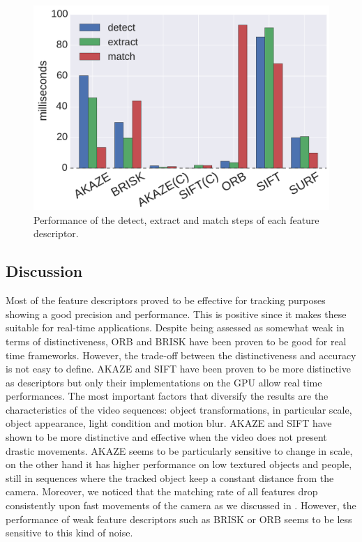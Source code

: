 \begin{figure}[!htb]
	\includegraphics[width=0.95\linewidth]{imgs/performances.pdf}
\vspace{-2.5mm}	
\caption{Performance of the detect, extract and match steps of each feature descriptor.}
\label{fig:speed_b}
\end{figure}


\subsection{Discussion}

Most of the feature descriptors proved to be effective for tracking purposes showing a good precision and performance. This is positive since it makes these suitable for real-time applications. Despite being assessed as somewhat weak in terms of distinctiveness, ORB and BRISK have been proven to be good for real time frameworks. 
However, the trade-off between the distinctiveness and accuracy is not easy to define.
AKAZE and SIFT have been proven to be more distinctive as descriptors but only their implementations on the GPU allow real time performances. 
The most important factors that diversify the results are the characteristics of the video sequences: object transformations, in particular scale, object appearance, light condition and motion blur. AKAZE and SIFT have shown to be more distinctive and effective when the video does not present drastic movements. AKAZE seems to be particularly sensitive to change in scale, on the other hand it has higher performance on low textured objects and people, still in sequences where the tracked object keep a constant distance from the camera.
Moreover, we noticed that the matching rate of all features drop consistently upon fast movements of the camera as we discussed in \cite{pieropan15}. However, the performance of weak feature descriptors such as BRISK or ORB seems to be less sensitive to this kind of noise. 

